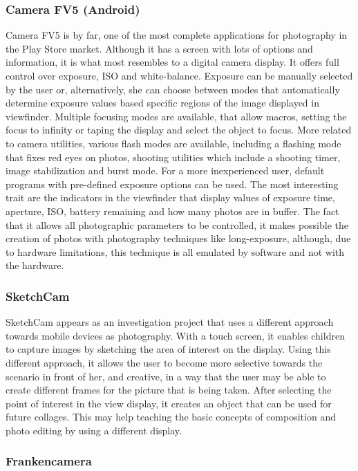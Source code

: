 \subsubsection{Camera FV5 (Android)}

Camera FV5 is by far, one of the most complete applications for photography in the Play Store market. Although it has a screen with lots of options and information, it is what most resembles to a digital camera display. It offers full control over exposure, ISO and white-balance. Exposure can be manually selected by the user or, alternatively, she can choose between modes that automatically determine exposure values based specific regions of the image displayed in viewfinder. 
Multiple focusing modes are available, that allow macros, setting the focus to infinity or taping the display and select the object to focus.
More related to camera utilities, various flash modes are available, including a flashing mode that fixes red eyes on photos, shooting utilities which include a shooting timer, image stabilization and burst mode.
For a more inexperienced user, default programs with pre-defined exposure options can be used.
The most interesting trait are the indicators in the viewfinder that display values of exposure time, aperture, ISO, battery remaining and how many photos are in buffer.
The fact that it allows all photographic parameters to be controlled, it makes possible the creation of photos with photography techniques like long-exposure, although, due to hardware limitations, this technique is all emulated by software and not with the hardware.

\subsubsection{SketchCam}

SketchCam appears as an investigation project that uses a different approach towards mobile devices as photography. With a touch screen, it enables children to capture images by sketching the area of interest on the display. 
Using this different approach, it allows the user to become more selective towards the scenario in front of her, and creative, in a way that the user may be able to create different frames for the picture that is being taken.  After selecting the point of interest in the view display, it creates an object that can be used for future collages. This may help teaching the basic concepts of composition and photo editing by using a different display. 


\subsubsection{Frankencamera}

